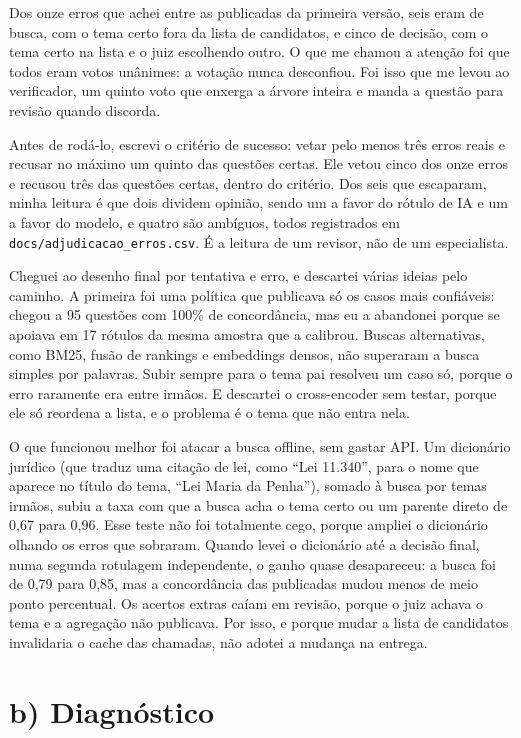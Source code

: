 \documentclass[11pt,a4paper]{article}
\begin{document}
Dos onze erros que achei entre as publicadas da primeira versão, seis eram de busca, com o
tema certo fora da lista de candidatos, e cinco de decisão, com o tema certo na lista e o
juiz escolhendo outro. O
que me chamou a atenção foi que todos eram votos unânimes: a votação nunca desconfiou. Foi
isso que me levou ao verificador, um quinto voto que enxerga a árvore inteira e manda a
questão para revisão quando discorda.

Antes de rodá-lo, escrevi o critério de sucesso: vetar pelo menos três erros reais e recusar
no máximo um quinto das questões certas. Ele vetou cinco dos onze erros e recusou três das
questões certas, dentro do critério. Dos seis que escaparam, minha leitura é que dois dividem
opinião, sendo um a favor do rótulo de IA e um a favor do modelo, e quatro são ambíguos,
todos registrados em \texttt{docs/adjudicacao\_erros.csv}. É a leitura de um revisor, não de um
especialista.

Cheguei ao desenho final por tentativa e erro, e descartei várias ideias pelo caminho. A primeira foi uma política que
publicava só os casos mais confiáveis: chegou a 95 questões com 100\% de concordância, mas eu
a abandonei porque se apoiava em 17 rótulos da mesma amostra que a calibrou. Buscas
alternativas, como BM25, fusão de rankings e embeddings densos, não superaram a busca simples por
palavras. Subir sempre para o tema pai resolveu um caso só, porque o erro raramente era entre
irmãos. E descartei o cross-encoder sem testar, porque ele só reordena a lista, e o problema é
o tema que não entra nela.

O que funcionou melhor foi atacar a busca offline, sem gastar API. Um dicionário jurídico (que
traduz uma citação de lei, como ``Lei 11.340'', para o nome que aparece no título do tema,
``Lei Maria da Penha''), somado à busca por temas irmãos, subiu a taxa com que a busca acha o
tema certo ou um parente direto de 0,67 para 0,96. Esse teste não foi totalmente cego, porque
ampliei o dicionário olhando os erros que sobraram. Quando levei o dicionário até a decisão
final, numa segunda rotulagem independente, o ganho quase desapareceu: a busca foi de 0,79
para 0,85, mas a concordância das publicadas mudou menos de meio ponto percentual. Os acertos
extras caíam em revisão, porque o juiz achava o tema e a agregação não publicava. Por isso, e
porque mudar a lista de candidatos invalidaria o cache das chamadas, não adotei a mudança na
entrega.

\section*{b) Diagnóstico}
\end{document}
